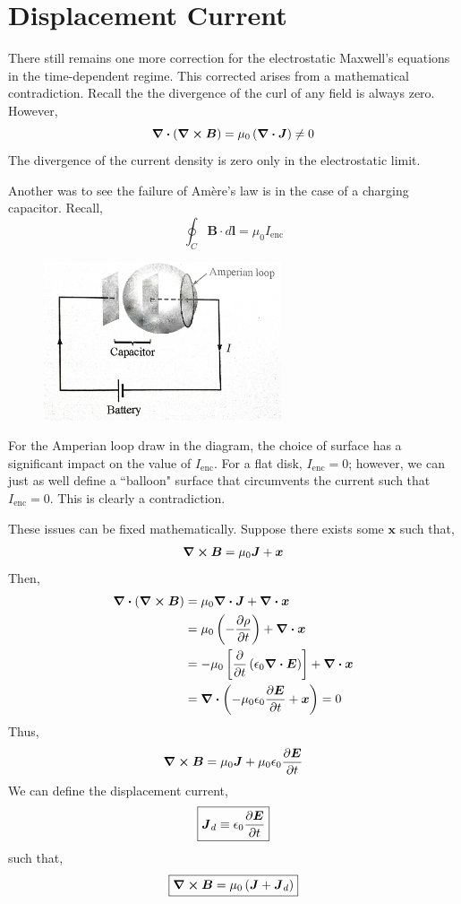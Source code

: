 \documentclass[12pt]{report}
\numberwithin{equation}{section}
\def\E{{\mbox{$\boldsymbol{E}$}}}
\def\B{{\mbox{$\boldsymbol{B}$}}}
\newcommand{\bd}[1]{\boldsymbol{#1}}
\begin{document}
	\section{Displacement Current}
	There still remains one more correction for the electrostatic Maxwell's equations in the time-dependent regime. This corrected arises from a mathematical contradiction. Recall the the divergence of the curl of any field is always zero. However,
	\begin{equation}
		\div \left(\curl \B\right) = \mu_0 \left(\div \bd{J}\right) \neq 0
	\end{equation}
	The divergence of the current density is zero only in the electrostatic limit.
	
	Another was to see the failure of Am\`ere's law is in the case of a charging capacitor. Recall,
	\begin{equation}
		\oint_C \B\cdot d\bd{l} = \mu_0 I_\text{enc}
	\end{equation} 
	\begin{figure}[H]
		\centering
		\includegraphics[width=7cm] {img/charging}
	\end{figure}
	
	For the Amperian loop draw in the diagram, the choice of surface has a significant impact on the value of $ I_\text{enc} $. For a flat disk, $ I_\text{enc}=0  $; however, we can just as well define a ``balloon" surface that circumvents the current such that $ I_\text{enc} =0 $. This is clearly a contradiction.
	
	These issues can be fixed mathematically. Suppose there exists some $ \bd{x} $ such that,
	\begin{equation}
		\curl \B = \mu_0 \bd{J} + \bd{x}
	\end{equation}
	Then,
	\begin{align}
		\div \left(\curl \B\right) &= \mu_0\div\bd{J} + \div\bd{x}\\
		&= \mu_0\left(-\pdv{\rho}{t}\right) + \div\bd{x}\\
		&= -\mu_0\left[\pdv{}{t}\left(\epsilon_0\div\E\right)\right]+ \div\bd{x}\\
		&= \div \left( -\mu_0\epsilon_0\pdv{\E}{t} + \bd{x}\right) = 0
	\end{align}
	Thus,
	\begin{equation}
		\curl \B = \mu_0 \bd{J} + \mu_0\epsilon_0\pdv{\E}{t}
	\end{equation}
	We can define the displacement current,
	\begin{equation}
		\boxed{\bd{J}_d \equiv \epsilon_0\pdv{\E}{t}}
	\end{equation}
	such that,
	\begin{equation}
		\boxed{\curl \B = \mu_0 \left(\bd{J} + \bd{J}_d\right)}
	\end{equation}
	
\end{document}
